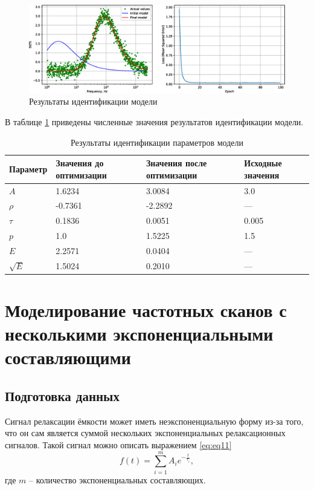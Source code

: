 \documentclass{report}
\begin{document}
        \begin{figure}[ht]
            \centering
            \includegraphics[width=\textwidth]{p_SGD}
            \caption{Результаты идентификации модели}
            \label{pic:pic4}
        \end{figure}

        В таблице \ref{table:table6} приведены численные значения результатов 
        идентификации модели.

        \begin{table}[ht]
            \caption{Результаты идентификации параметров модели}
            \label{table:table6}
            \centering
            \begin{tabular}{ | m{2.5cm} | m{2.5cm} | m{2.5cm} | m{2.5cm} | }
                \hline
                Параметр & Значения до оптимизации & Значения после оптимизации & Исходные значения \\
                \hline
                $A$ & 1.6234 & 3.0084 & 3.0\\
                \hline
                $\rho$ & -0.7361 & -2.2892 & --- \\
                \hline
                $\tau$ & 0.1836 & 0.0051 & 0.005 \\
                \hline
                $p$ & 1.0 & 1.5225 & 1.5 \\
                \hline
                $E$ & 2.2571 & 0.0404 & --- \\
                \hline
                $\sqrt{E}$ & 1.5024 & 0.2010 & ---\\
                \hline
            \end{tabular}
        \end{table}


        \chapter{Моделирование частотных сканов с несколькими экспоненциальными составляющими}

        \section{Подготовка данных}
        Сигнал релаксации ёмкости может иметь неэкспоненциальную форму из-за того, что 
        он сам является суммой нескольких экспоненциальных релаксационных сигналов. 
        Такой сигнал можно описать выражением \ref{eq:eq11}
        \begin{equation}
            \label{eq:eq11}
            f\left(t\right) = \sum_{i=1}^m A_i e^{-\frac{t}{\tau_i}},
        \end{equation}
        где $m$ -- количество экспоненциальных составляющих.
\end{document}
